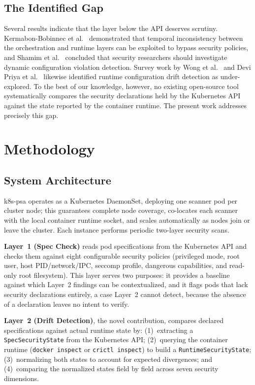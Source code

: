 \documentclass[conference]{IEEEtran}
\begin{document}
\subsection{The Identified Gap}

Several results indicate that the layer below the API deserves scrutiny. Kermabon-Bobinnec et al.~\cite{prospec2022} demonstrated that temporal inconsistency between the orchestration and runtime layers can be exploited to bypass security policies, and Shamim et al.~\cite{shamim2025} concluded that security researchers should investigate dynamic configuration violation detection. Survey work by Wong et al.~\cite{wong2023} and Devi Priya et al.~\cite{devipriya2023} likewise identified runtime configuration drift detection as under-explored. To the best of our knowledge, however, no existing open-source tool systematically compares the security declarations held by the Kubernetes API against the state reported by the container runtime. The present work addresses precisely this gap.

\section{Methodology}

\subsection{System Architecture}

k8s-psa operates as a Kubernetes DaemonSet, deploying one scanner pod per cluster node; this guarantees complete node coverage, co-locates each scanner with the local container runtime socket, and scales automatically as nodes join or leave the cluster. Each instance performs periodic two-layer security scans.

\textbf{Layer~1 (Spec Check)} reads pod specifications from the Kubernetes API and checks them against eight configurable security policies (privileged mode, root user, host PID/network/IPC, seccomp profile, dangerous capabilities, and read-only root filesystem). This layer serves two purposes: it provides a baseline against which Layer~2 findings can be contextualized, and it flags pods that lack security declarations entirely, a case Layer~2 cannot detect, because the absence of a declaration leaves no intent to verify.

\textbf{Layer~2 (Drift Detection)}, the novel contribution, compares declared specifications against actual runtime state by: (1)~extracting a \texttt{SpecSecurityState} from the Kubernetes API; (2)~querying the container runtime (\texttt{docker inspect} or \texttt{crictl inspect}) to build a \texttt{RuntimeSecurityState}; (3)~normalizing both states to account for expected divergences; and (4)~comparing the normalized states field by field across seven security dimensions.
\end{document}
